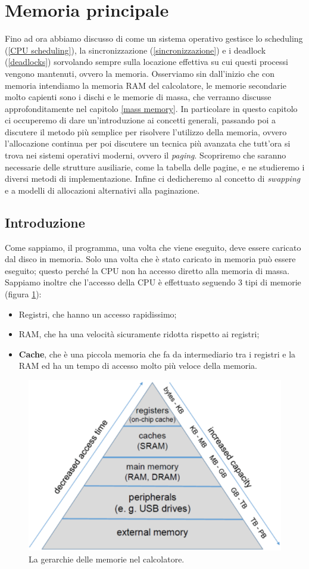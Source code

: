 \pagebreak
\section{Memoria principale}\label{main memory}
Fino ad ora abbiamo discusso di come un sistema operativo gestisce lo scheduling (\ref{CPU scheduling}), la sincronizzazione (\ref{sincronizzazione}) e i deadlock (\ref{deadlocks}) sorvolando sempre sulla locazione effettiva su cui questi processi vengono mantenuti, ovvero la memoria. Osserviamo sin dall'inizio che con memoria intendiamo la memoria RAM del calcolatore, le memorie secondarie molto capienti sono i dischi e le memorie di massa, che verranno discusse approfonditamente nel capitolo \ref{mass memory}. In particolare in questo capitolo ci occuperemo di dare un'introduzione ai concetti generali, passando poi a discutere il metodo più semplice per risolvere l'utilizzo della memoria, ovvero l'allocazione continua per poi discutere un tecnica più avanzata che tutt'ora si trova nei sistemi operativi moderni, ovvero il \textit{paging}. Scopriremo che saranno necessarie delle strutture ausiliarie, come la tabella delle pagine, e ne studieremo i diversi metodi di implementazione. Infine ci dedicheremo al concetto di \textit{swapping} e a modelli di allocazioni alternativi alla paginazione.

\subsection{Introduzione}
Come sappiamo, il programma, una volta che viene eseguito, deve essere caricato dal disco in memoria. Solo una volta che è stato caricato in memoria può essere eseguito; questo perché la CPU non ha accesso diretto alla memoria di massa. Sappiamo inoltre che l'accesso della CPU è effettuato seguendo 3 tipi di memorie (figura \ref{fig:memory_hierarchy}):
\vspace{-5px}
\begin{itemize}
\setlength{\itemsep}{-.15 em}
    \item Registri, che hanno un accesso rapidissimo;
    \item RAM, che ha una velocità sicuramente ridotta rispetto ai registri;
    \item \textbf{Cache}, che è una piccola memoria che fa da intermediario tra i registri e la RAM ed ha un tempo di accesso molto più veloce della memoria.
\end{itemize}
\begin{figure}[h]
    \centering
    \includegraphics[width = .5\textwidth]{../res/imgs/main memory/memory_hierarchy.png}
    \caption{La gerarchie delle memorie nel calcolatore.}
    \label{fig:memory_hierarchy}
\end{figure}

